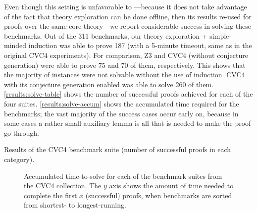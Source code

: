 Even though this setting is unfavorable to \TheSy---because it does not take advantage of the fact that theory exploration can be done offline, then its results re-used for proofs over the same core theory---we report considerable success in solving these benchmarks.
Out of the 311 benchmarks, our theory exploration + simple-minded induction was able to prove 187 (with a 5-minute timeout, same as in the original CVC4 experiments).
For comparison, Z3 and CVC4 (without conjecture generation) were able to prove 75 and 70 of them, respectively.
This shows that the majority of instances were not solvable without the use of induction.
CVC4 with its conjecture generation enabled was able to solve 260 of them.
\autoref{results:solve-table} shows the number of successful proofs achieved for each of the four suites.
\autoref{results:solve-accum} shows the accumulated time required for the benchmarks; the vast majority of the success cases occur early on, because in some cases a rather small auxiliary lemma is all that is needed to make the proof go through.

\begin{table}[t]
\centering

\vspace{5pt}
\caption{Results of the CVC4 benchmark suite (number of successful proofs in each category).}
\label{results:solve-table}
\end{table}

\begin{figure}[t]
    \centering
    
    \caption{Accumulated time-to-solve for each of the benchmark suites from the CVC4 collection.
    The $y$ axis shows the amount of time needed to complete the first $x$ (successful) proofs, when benchmarks are sorted from shortest- to longest-running.}
    \label{results:solve-accum}
\end{figure}